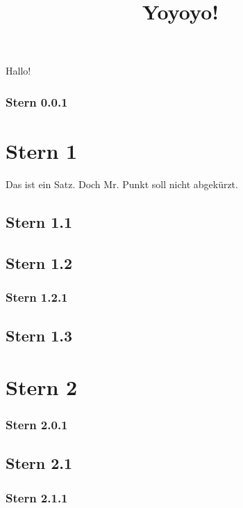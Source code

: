 \documentclass{article}
\title{Yoyoyo!}
\begin{document}
\maketitle
Hallo!
\subsubsection{Stern 0.0.1}
\section{Stern 1}
Das ist ein Satz. Doch Mr. Punkt soll nicht abgek\"urzt.
\subsection{Stern 1.1}
\subsection{Stern 1.2}
\subsubsection{Stern 1.2.1}
\subsection{Stern 1.3}
\section{Stern 2}
\subsubsection{Stern 2.0.1}
\subsection{Stern 2.1}
\subsubsection{Stern 2.1.1}
\end{document}
